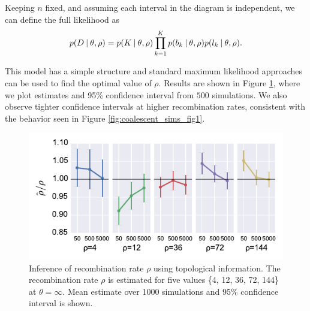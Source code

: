 Keeping $n$ fixed, and assuming each interval in the diagram is independent, we can define the full likelihood as
\begin{equation}
p(D \:\vert\: \theta,\rho) = p(K \:\vert\: \theta,\rho)\displaystyle\prod_{k=1}^{K}p(b_k \:\vert\: \theta,\rho)p(l_k  \:\vert\: \theta,\rho).
\end{equation}

This model has a simple structure and standard maximum likelihood approaches can be used to find the optimal value of $\rho$.
Results are shown in Figure \ref{fig:param_inference}, where we plot estimates and 95\% confidence interval from $500$ simulations.
We also observe tighter confidence intervals at higher recombination rates, consistent with the behavior seen in Figure \ref{fig:coalescent_sims_fig1}.

\begin{figure}
\centering
\includegraphics[width=\columnwidth]{./fig/parametric_inference/param_inference.pdf}
\caption[Inference of recombination rate $\rho$ using topological information]{Inference of recombination rate $\rho$ using topological information. The recombination rate $\rho$ is estimated for five values \{4, 12, 36, 72, 144\} at $\theta=\infty$. Mean estimate over 1000 simulations and 95\% confidence interval is shown.}
\label{fig:param_inference}
\end{figure}


